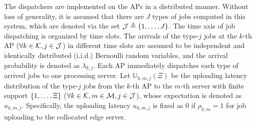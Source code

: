 The dispatchers are implemented on the APs in a distributed manner.
Without loss of generality, it is assumed that there are $J$ types of jobs computed in this system, which are denoted via the set $\mathcal{J} \triangleq \{1,\dots,J\}$.
The time axis of job dispatching is organized by time slots.
The arrivals of the type-$j$ jobs at the $k$-th AP ($\forall k\in\mathcal{K},j\in\mathcal{J}$) in different time slots are assumed to be independent and identically distributed (i.i.d.) Bernoulli random variables, and the arrival probability is denoted as $\lambda_{k,j}$.
Each AP immediately dispatches each type of arrived jobs to one processing server.
%
Let $\mathbb{U}_{k,m,j}(\Xi)$ be the uploading latency distribution of the type-$j$ jobs from the $k$-th AP to the $m$-th server with finite support $\{1, \dots, \Xi\}$ ($\forall k\in\mathcal{K}, m\in\mathcal{M}, j\in\mathcal{J}$), whose expectation is denoted as $u_{k,m,j}$.
Specifically, the uploading latency $u_{k,m,j}$ is fixed as $0$ if $\rho_{k,m}=1$ for job uploading to the collocated edge server.

